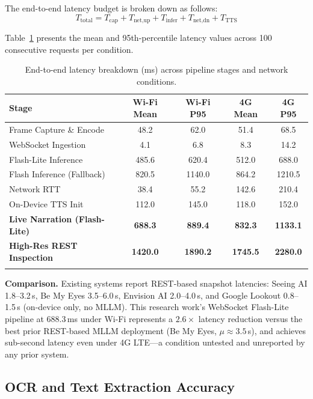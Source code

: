 \documentclass[pdflatex,sn-mathphys-num]{sn-jnl}
\theoremstyle{thmstyleone}%
\theoremstyle{thmstyletwo}%
\theoremstyle{thmstylethree}%
\begin{document}
The end-to-end latency budget is broken down as follows:
\begin{equation}
  T_{\text{total}} = T_{\text{cap}} + T_{\text{net,up}} + T_{\text{infer}} +
                     T_{\text{net,dn}} + T_{\text{TTS}}
\end{equation}

Table~\ref{tab:latency} presents the mean and 95th-percentile latency values across
100 consecutive requests per condition.

\begin{table}[htbp]
\caption{End-to-end latency breakdown (ms) across pipeline stages
         and network conditions.}\label{tab:latency}
\begin{tabular}{@{}lcccc@{}}
\toprule
Stage & Wi-Fi Mean & Wi-Fi P95 & 4G Mean & 4G P95 \\
\midrule
Frame Capture \& Encode     & 48.2  & 62.0   & 51.4  & 68.5  \\
WebSocket Ingestion         & 4.1   & 6.8    & 8.3   & 14.2  \\
Flash-Lite Inference        & 485.6 & 620.4  & 512.0 & 688.0 \\
Flash Inference (Fallback)  & 820.5 & 1140.0 & 864.2 & 1210.5\\
Network RTT                 & 38.4  & 55.2   & 142.6 & 210.4 \\
On-Device TTS Init          & 112.0 & 145.0  & 118.0 & 152.0 \\
\midrule
\textbf{Live Narration (Flash-Lite)} & \textbf{688.3} & \textbf{889.4}
                                     & \textbf{832.3} & \textbf{1133.1} \\
\textbf{High-Res REST Inspection}    & \textbf{1420.0}& \textbf{1890.2}
                                     & \textbf{1745.5}& \textbf{2280.0} \\
\botrule
\end{tabular}
\end{table}

\textbf{Comparison.} Existing systems report REST-based snapshot latencies:
Seeing AI 1.8--3.2\,s, Be My Eyes 3.5--6.0\,s, Envision AI 2.0--4.0\,s,
and Google Lookout 0.8--1.5\,s (on-device only, no MLLM). This research
work's WebSocket Flash-Lite pipeline at 688.3\,ms under Wi-Fi represents a
$\mathbf{2.6\times}$ latency reduction versus the best prior REST-based MLLM
deployment (Be My Eyes, $\mu \approx 3.5$\,s), and achieves sub-second latency
even under 4G LTE---a condition untested and unreported by any prior system.

\subsection{OCR and Text Extraction Accuracy}
\end{document}
